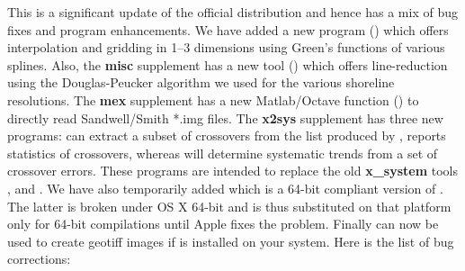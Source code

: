 This is a significant update of the official distribution and hence has a mix of bug fixes
and program enhancements.  We have added a new program () which
offers interpolation and gridding in 1--3 dimensions using Green's functions of various
splines.  Also, the {\bf misc} supplement has a new tool () which offers
line-reduction using the Douglas-Peucker algorithm we used for the various shoreline
resolutions.  The {\bf mex} supplement has a new Matlab/Octave function
() to directly read Sandwell/Smith *.img files.  The {\bf x2sys}
supplement has three new programs:  can extract a subset of crossovers
from the list produced by ,  reports statistics
of crossovers, whereas  will
determine systematic trends from a set of crossover errors.  These programs are intended
to replace the old {\bf x\_system} tools ,  and .
We have also temporarily added  which is a 64-bit compliant version
of .  The latter is broken under OS X 64-bit and is
thus substituted on that platform only for 64-bit compilations until Apple fixes the problem.
Finally  can now be used to create geotiff images if  is installed on your system.
Here is the list of bug corrections:
